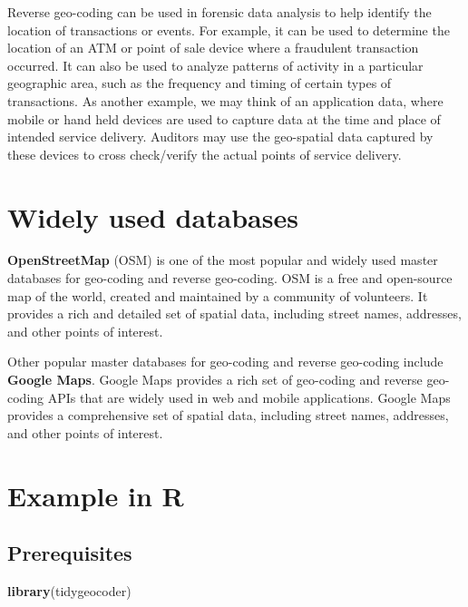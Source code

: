\documentclass[
]{book}
\newenvironment{Shaded}{\begin{snugshade}}{\end{snugshade}}
\newcommand{\FunctionTok}[1]{\textcolor[rgb]{0.13,0.29,0.53}{\textbf{#1}}}
\newcommand{\NormalTok}[1]{#1}
\begin{document}
Reverse geo-coding can be used in forensic data analysis to help identify the location of transactions or events. For example, it can be used to determine the location of an ATM or point of sale device where a fraudulent transaction occurred. It can also be used to analyze patterns of activity in a particular geographic area, such as the frequency and timing of certain types of transactions. As another example, we may think of an application data, where mobile or hand held devices are used to capture data at the time and place of intended service delivery. Auditors may use the geo-spatial data captured by these devices to cross check/verify the actual points of service delivery.

\hypertarget{widely-used-databases}{%
\section{Widely used databases}\label{widely-used-databases}}

\textbf{OpenStreetMap} (OSM) is one of the most popular and widely used master databases for geo-coding and reverse geo-coding. OSM is a free and open-source map of the world, created and maintained by a community of volunteers. It provides a rich and detailed set of spatial data, including street names, addresses, and other points of interest.

Other popular master databases for geo-coding and reverse geo-coding include \textbf{Google Maps}. Google Maps provides a rich set of geo-coding and reverse geo-coding APIs that are widely used in web and mobile applications. Google Maps provides a comprehensive set of spatial data, including street names, addresses, and other points of interest.

\hypertarget{example-in-r}{%
\section{Example in R}\label{example-in-r}}

\hypertarget{prerequisites}{%
\subsection{Prerequisites}\label{prerequisites}}

\begin{Shaded}
\begin{Highlighting}[]
\FunctionTok{library}\NormalTok{(tidygeocoder)}
\end{Highlighting}
\end{Shaded}
\end{document}
